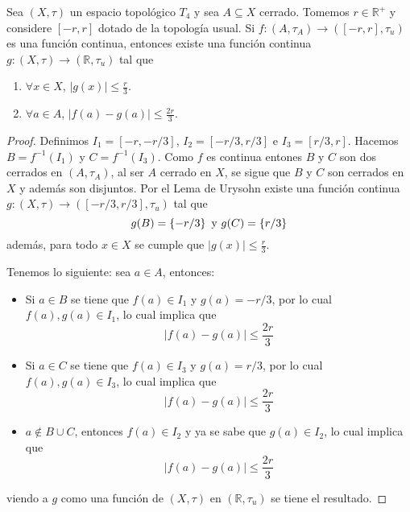 \documentclass[12pt]{report}
\newcounter{it}
\theoremstyle{largebreak}
\newcommand\abs[1]{\ensuremath{\left|#1\right|}}
\newcommand\cf[3]{\ensuremath{#1:#2\rightarrow#3}}
\begin{document}
    \begin{propo}
        Sea $(X,\tau)$ un espacio topológico $T_4$ y sea $A\subseteq X$ cerrado. Tomemos $r\in\mathbb{R}^+$ y considere $[-r,r]$ dotado de la topología usual. Si $\cf{f}{(A,\tau_A)}{([-r,r],\tau_u)}$ es una función continua, entonces existe una función continua $\cf{g}{(X,\tau)}{(\mathbb{R},\tau_u)}$ tal que
        \renewcommand{\theenumi}{\roman{enumi}}
        \begin{enumerate}
            \item $\forall x\in X$, $\abs{g(x)}\leq\frac{r}{3}$.
            \item $\forall a\in A$, $\abs{f(a)-g(a)}\leq\frac{2r}{3}$.
        \end{enumerate}
    \end{propo}

    \begin{proof}
        Definimos $I_1=[-r,-r/3]$, $I_2=[-r/3,r/3]$ e $I_3=[r/3,r]$. Hacemos $B=f^{-1}(I_1)$ y $C=f^{-1}(I_3)$. Como $f$ es continua entones $B$ y $C$ son dos cerrados en $(A,\tau_A)$, al ser $A$ cerrado en $X$, se sigue que $B$ y $C$ son cerrados en $X$ y además son disjuntos. Por el Lema de Urysohn existe una función continua $\cf{g}{(X,\tau)}{([-r/3,r/3],\tau_u)}$ tal que
        \begin{equation*}
            g(B)=\left\{ -r/3\right\}\textup{ y }g(C)=\left\{r/3\right\}
        \end{equation*}
        además, para todo $x\in X$ se cumple que $\abs{g(x)}\leq\frac{r}{3}$.

        Tenemos lo siguiente: sea $a\in A$, entonces:
        \begin{itemize}
            \item Si $a\in B$ se tiene que $f(a)\in I_1$ y $g(a)=-r/3$, por lo cual $f(a),g(a)\in I_1$, lo cual implica que
            \begin{equation*}
                \abs{f(a)-g(a)}\leq\frac{2r}{3}
            \end{equation*}
            \item Si $a\in C$ se tiene que $f(a)\in I_3$ y $g(a)=r/3$, por lo cual $f(a),g(a)\in I_3$, lo cual implica que
            \begin{equation*}
                \abs{f(a)-g(a)}\leq\frac{2r}{3}
            \end{equation*}
            \item $a\notin B\cup C$, entonces $f(a)\in I_2$ y ya se sabe que $g(a)\in I_2$, lo cual implica que
            \begin{equation*}
                \abs{f(a)-g(a)}\leq\frac{2r}{3}
            \end{equation*}
        \end{itemize}
        viendo a $g$ como una función de $(X,\tau)$ en $(\mathbb{R},\tau_u)$ se tiene el resultado.
    \end{proof}
    
\end{document}
